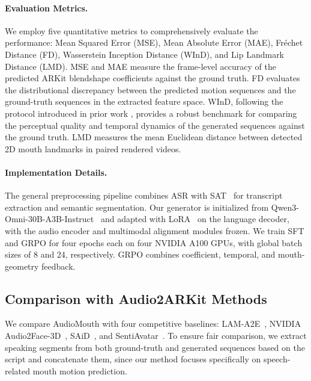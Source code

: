 \paragraph{Evaluation Metrics.}
We employ five quantitative metrics to comprehensively evaluate the performance: Mean Squared Error (MSE), Mean Absolute Error (MAE), Fréchet Distance (FD), Wasserstein Inception Distance (WInD), and Lip Landmark Distance (LMD). MSE and MAE measure the frame-level accuracy of the predicted ARKit blendshape coefficients against the ground truth. FD evaluates the distributional discrepancy between the predicted motion sequences and the ground-truth sequences in the extracted feature space. WInD, following the protocol introduced in prior work \cite{park2023said}, provides a robust benchmark for comparing the perceptual quality and temporal dynamics of the generated sequences against the ground truth. LMD measures the mean Euclidean distance between detected 2D mouth landmarks in paired rendered videos.

\paragraph{Implementation Details.}
The general preprocessing pipeline combines ASR with SAT~\cite{frohmann2024segment} for transcript extraction and semantic segmentation.
Our generator is initialized from Qwen3-Omni-30B-A3B-Instruct~\cite{xu2025qwen3omni} and adapted with LoRA~\cite{hu2021lora} on the language decoder, with the audio encoder and multimodal alignment modules frozen.
We train SFT and GRPO for four epochs each on four NVIDIA A100 GPUs, with global batch sizes of 8 and 24, respectively.
GRPO combines coefficient, temporal, and mouth-geometry feedback.


\subsection{Comparison with Audio2ARKit Methods}
\label{sec:main_comparison}

We compare AudioMouth with four competitive baselines: LAM-A2E~\cite{lam}, NVIDIA Audio2Face-3D~\cite{chung2025audio2face}, SAiD~\cite{park2023said}, and SentiAvatar~\cite{jin2026sentiavatar}. To ensure fair comparison, we extract speaking segments from both ground-truth and generated sequences based on the script and concatenate them, since our method focuses specifically on speech-related mouth motion prediction.

